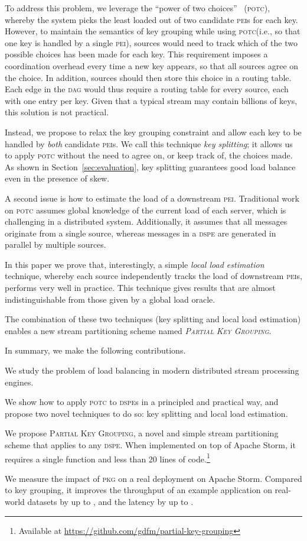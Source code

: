 \documentclass[10pt,conference,letterpaper]{IEEEtran}
\newenvironment {squishlist}
{\begin{list}{}
  { \setlength{\itemsep}{1pt}
     \setlength{\parsep}{1pt}
     \setlength{\topsep}{1pt}
     \setlength{\partopsep}{1pt}
     \setlength{\leftmargin}{1.5em}
     \setlength{\labelwidth}{1em}
     \setlength{\labelsep}{0.5em} } }
{\end{list}}
\newcommand{\pei}{\textsc{pei}\xspace}
\newcommand{\peis}{{\pei}s\xspace}
\newcommand{\potc}{\textsc{p\textup{o}tc}\xspace}
\newcommand{\dspe}{\textsc{dspe}\xspace}
\newcommand{\dspes}{{\dspe}s\xspace}
\newcommand{\dagr}{\textsc{dag}\xspace}
\newcommand{\pkg}{\textsc{Partial Key Grouping}\xspace}
\newcommand{\pkgs}{\textsc{pkg}\xspace}
\begin{document}
\clearpage

To address this problem, we leverage the ``power of two choices''~\citep{mitzenmacher2001power} (\potc), whereby the system picks the least loaded out of two candidate \peis for each key.
However, to maintain the semantics of key grouping while using \potc (i.e., so that one key is handled by a single \pei), sources would need to track which of the two possible choices has been made for each key.
This requirement imposes a coordination overhead every time a new key appears, so that all sources agree on the choice.
In addition, sources should then store this choice in a routing table. 
Each edge in the \dagr would thus require a routing table for every source, each with one entry per key.
Given that a typical stream may contain billions of keys, this solution is not practical.

Instead, we propose to relax the key grouping constraint and allow each key to be handled by \emph{both} candidate \peis.
We call this technique \emph{key splitting}; it allows us to apply \potc without the need to agree on, or keep track of, the choices made.
As shown in Section~\ref{sec:evaluation}, key splitting guarantees good load balance even in the presence of skew.

A second issue is how to estimate the load of a downstream \pei.
Traditional work on \potc assumes global knowledge of the current load of each server, which is challenging in a distributed system.
Additionally, it assumes that all messages originate from a single source, whereas messages in a \dspe are generated in parallel by multiple sources.


In this paper we prove that, interestingly, a simple \emph{local load estimation} technique, whereby each source independently tracks the load of downstream \peis, performs very well in practice.
This technique gives results that are almost indistinguishable from those given by a global load oracle.


The combination of these two techniques (key splitting and local load estimation) enables a new stream partitioning scheme named \emph{\pkg}.




In summary, we make the following contributions.
\begin{squishlist}
\item We study the problem of load balancing in modern distributed stream processing engines.
\item We show how to apply \potc to \dspes in a principled and practical way, and propose two novel techniques to do so: key splitting and local load estimation.
\item We propose \pkg, a novel and simple stream partitioning scheme that applies to any \dspe.
When implemented on top of Apache Storm, it requires a single function and less than 20 lines of code.\footnote{Available at \url{https://github.com/gdfm/partial-key-grouping}}
\item We measure the impact of \pkgs on a real deployment on Apache Storm.
Compared to key grouping, it improves the throughput of an example application on real-world datasets by up to , and the latency by up to .
\end{squishlist}
\end{document}
